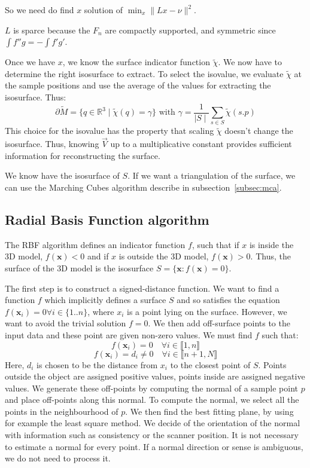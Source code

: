\documentclass[a4paper]{article}
\begin{document}
So we need do find $x$ solution of $\min_{x}\|Lx - \nu\|^2$.

$L$ is sparce because the $F_n$ are compactly supported, and symmetric since $\int f''g = -\int f'g'$.

Once we have $x$, we know the surface indicator function $\tilde{\chi}$. We now have to determine the right isosurface to extract. To select the isovalue, we evaluate $\tilde{\chi}$ at the sample positions and use the average of the values for extracting the isosurface. Thus:
$$\partial\tilde{M} = \{q \in \mathbb{R}^3 \mid \tilde{\chi}(q) = \gamma\} \text{ with } \gamma = \frac{1}{\mid S\mid}\sum_{s \in S}\tilde{\chi}(s.p)$$
This choice for the isovalue has the property that scaling $\tilde{\chi}$ doesn't change the isosurface. Thus, knowing $\vec{V}$ up to a multiplicative constant provides sufficient information for reconstructing the surface.

We know have the isosurface of $S$. If we want a triangulation of the surface, we can use the Marching Cubes algorithm describe in subsection~\ref{subsec:mca}.

\subsection{Radial Basis Function algorithm}
The RBF algorithm defines an indicator function $f$, such that if $x$ is inside the 3D model, $f(\boldsymbol{x}) < 0$ and if $x$ is outside the 3D model, $f(\boldsymbol{x}) > 0$. Thus, the surface of the 3D model is the isosurface $S = \{\boldsymbol{x}: f(\boldsymbol{x}) =0\}$.

The first step is to construct a signed-distance function. We want to find a function $f$ which implicitly defines a surface $S$ and so satisfies the equation $f(\boldsymbol{x}_i) = 0 \forall i \in \{1..n\}$, where $x_i$ is a point lying on the surface. However, we want to avoid the trivial solution $f = 0$. We then add off-surface points to the input data and these point are given non-zero values. We must find $f$ such that:
$$f(\boldsymbol{x}_i) = 0 \hspace{1em}\forall i \in \llbracket 1,n\rrbracket$$
$$f(\boldsymbol{x}_i) = d_i \ne 0 \hspace{1em}\forall i \in\llbracket n+1,N\rrbracket$$
Here, $d_i$ is chosen to be the distance from $x_i$ to the closest point of $S$. Points outside the object are assigned positive values, points inside are assigned negative values. We generate these off-points by computing the normal of a sample point $p$ and place off-points along this normal. To compute the normal, we select all the points in the neighbourhood of $p$. We then find the best fitting plane, by using for example the least square method. We decide of the orientation of the normal with information such as consistency or the scanner position. It is not necessary to estimate a normal for every point. If a normal direction or sense is ambiguous, we do not need to process it.
\end{document}
